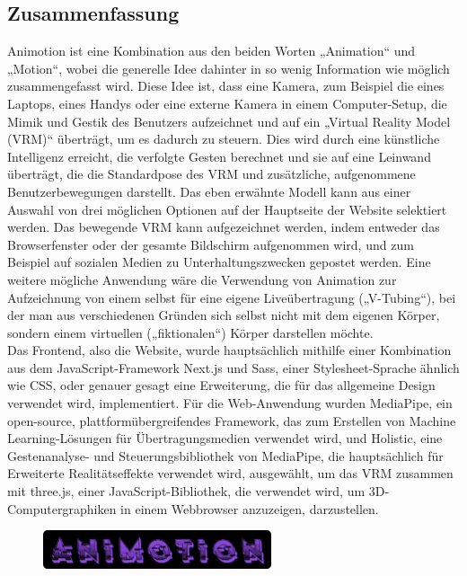 \newpage
\begin{spacing}{1}
    \chapter*{Zusammenfassung}
\end{spacing}
Animotion ist eine Kombination aus den beiden Worten „Animation“ und „Motion“, wobei die generelle Idee dahinter in so wenig Information wie möglich zusammengefasst wird. Diese Idee ist, dass eine Kamera, zum Beispiel die eines Laptops, eines Handys oder eine externe Kamera in einem Computer-Setup, die Mimik und Gestik des Benutzers aufzeichnet und auf ein „Virtual Reality Model (VRM)“ überträgt, um es dadurch zu steuern. Dies wird durch eine künstliche Intelligenz erreicht, die verfolgte Gesten berechnet und sie auf eine Leinwand überträgt, die die Standardpose des VRM und zusätzliche, aufgenommene Benutzerbewegungen darstellt. Das eben erwähnte Modell kann aus einer Auswahl von drei möglichen Optionen auf der Hauptseite der Website selektiert werden. Das bewegende VRM kann aufgezeichnet werden, indem entweder das Browserfenster oder der gesamte Bildschirm aufgenommen wird, und zum Beispiel auf sozialen Medien zu Unterhaltungszwecken gepostet werden. Eine weitere mögliche Anwendung wäre die Verwendung von Animation zur Aufzeichnung von einem selbst für eine eigene Liveübertragung („V-Tubing“), bei der man aus verschiedenen Gründen sich selbst nicht mit dem eigenen Körper, sondern einem virtuellen („fiktionalen“) Körper darstellen möchte.
\\
Das Frontend, also die Website, wurde hauptsächlich mithilfe einer Kombination aus dem JavaScript-Framework Next.js und Sass, einer Stylesheet-Sprache ähnlich wie CSS, oder genauer gesagt eine Erweiterung, die für das allgemeine Design verwendet wird, implementiert. Für die Web-Anwendung wurden MediaPipe, ein open-source, plattformübergreifendes Framework, das zum Erstellen von Machine Learning-Lösungen für Übertragungsmedien verwendet wird, und Holistic, eine Gestenanalyse- und Steuerungsbibliothek von MediaPipe, die hauptsächlich für Erweiterte Realitätseffekte verwendet wird, ausgewählt, um das VRM zusammen mit three.js, einer JavaScript-Bibliothek, die verwendet wird, um 3D-Computergraphiken in einem Webbrowser anzuzeigen, darzustellen.
\\
\begin{figure}[htb]
    \centering
    \includegraphics[width=0.6\textwidth]{pics/animotionlogo.png}
\end{figure}